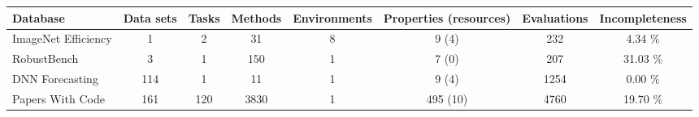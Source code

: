 
    \begin{tabular}{lccccccc}
        \toprule 
        Database & Data sets & Tasks & Methods & Environments & Properties (resources) & Evaluations & Incompleteness \\
        \midrule
        ImageNet Efficiency & 1 & 2 & 31 & 8 & 9 (4) & 232 &  4.34 \% \\
        RobustBench & 3 & 1 & 150 & 1 & 7 (0) & 207 & 31.03 \% \\
        DNN Forecasting & 114 & 1 & 11 & 1 & 9 (4) & 1254 &  0.00 \% \\
        Papers With Code & 161 & 120 & 3830 & 1 & 495 (10) & 4760 & 19.70 \% \\
        \bottomrule
    \end{tabular}